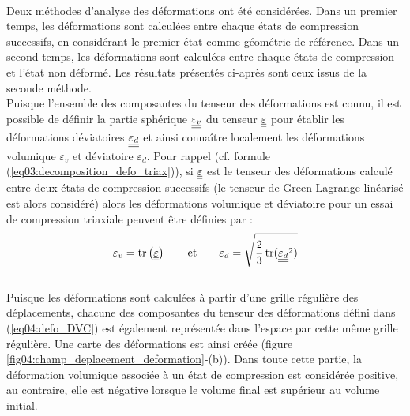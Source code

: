 		\\Deux méthodes d'analyse des déformations ont été considérées. Dans un premier temps, les déformations sont calculées entre chaque états de compression successifs, en considérant le premier état comme géométrie de référence. Dans un second temps, les déformations sont calculées entre chaque états de compression et l'état non déformé. Les résultats présentés ci-après sont ceux issus de la seconde méthode.
		\\Puisque l'ensemble des composantes du tenseur des déformations est connu, il est possible de définir la partie sphérique $\underline{\underline{\varepsilon_v}}$ du tenseur $\underline{\underline{\varepsilon}}$ pour établir les déformations déviatoires $\underline{\underline{\varepsilon_d}}$ et ainsi connaître localement les déformations volumique $\varepsilon_v$ et déviatoire $\varepsilon_d$. Pour rappel (cf. formule (\ref{eq03:decomposition_defo_triax})), si $\underline{\underline{\varepsilon}}$ est le tenseur des déformations calculé entre deux états de compression successifs (le tenseur de Green-Lagrange linéarisé est alors considéré) alors les déformations volumique et déviatoire pour un essai de compression triaxiale peuvent être définies par :
		\begin{equation}\label{eq04:defo_deviatoire_volumique}
			\varepsilon_v = \mathrm{tr} \left( \underline{\underline{\varepsilon}} \right)
			\qquad\text{et}\qquad
			\varepsilon_d = \sqrt{\cfrac{2}{3}\;\mathrm{tr}(\underline{\underline{\varepsilon_d}}^2)}
		\end{equation}
		\\Puisque les déformations sont calculées à partir d'une grille régulière des déplacements, chacune des composantes du tenseur des déformations défini dans (\ref{eq04:defo_DVC}) est également représentée dans l'espace par cette même grille régulière. Une carte des déformations est ainsi créée (figure \ref{fig04:champ_deplacement_deformation}-(b)). Dans toute cette partie, la déformation volumique associée à un état de compression est considérée positive, au contraire, elle est négative lorsque le volume final est supérieur au volume initial.
